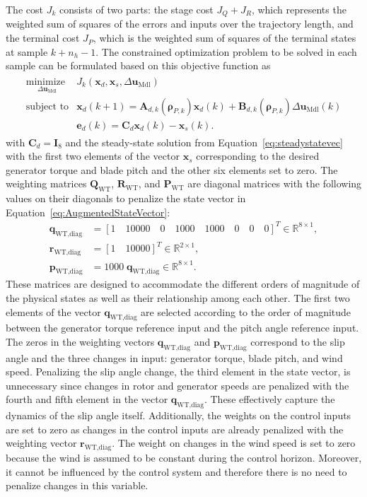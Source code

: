 The cost \( J_k \) consists of two parts: the stage cost $J_Q + J_R$, which represents the weighted sum of squares of the errors and inputs over the trajectory length, and the terminal cost $J_P$, which is the weighted sum of squares of the terminal states at sample $k+n_h-1$.
The constrained optimization problem to be solved in each sample can be formulated based on this objective function as
\begin{align} \label{eq:ObjFunWT}
    \begin{array}{ll}
        \underset{\Delta \bm{u}_{\text{Mdl}}}{\text{minimize }} & J_k(\bm{x}_d, \bm{x}_{s}, \Delta \bm{u}_{\text{Mdl}}) \\[10pt]
        \text{subject to} & \bm{x}_d(k+1) = \bm{A}_{d,k}(\bm{\rho}_{P,k}) \bm{x}_d(k) + \bm{B}_{d,k}(\bm{\rho}_{P,k}) \Delta \bm{u}_{\text{Mdl}}(k) \\[10pt]
        & \bm{e}_d(k) = \bm{C}_d \bm{x}_d(k) -\bm{x}_s(k).
    \end{array}
\end{align}
with $\bm{C}_d = \bm{I}_{8}$ and the steady-state solution from Equation~\eqref{eq:steadystatevec} with the first two elements of the vector $\bm{x}_s$ corresponding to the desired generator torque and blade pitch and the other six elements set to zero.
The weighting matrices \( \bm{Q}_{\text{WT}} \), \( \bm{R}_{\text{WT}} \), and \( \bm{P}_{\text{WT}} \) are diagonal matrices with the following values on their diagonals to penalize the state vector in Equation~\eqref{eq:AugmentedStateVector}:
\begin{align}
    \bm{q}_{\text{WT,diag}} &= [1 \quad 10000 \quad 0 \quad 1000 \quad 1000 \quad 0 \quad 0 \quad 0]^T \in \mathbb{R}^{8 \times 1}, \\
    \bm{r}_{\text{WT,diag}} &= [1 \quad 10000]^T \in \mathbb{R}^{2 \times 1}, \\
    \bm{p}_{\text{WT,diag}} &= 1000 \; \bm{q}_{\text{WT,diag}} \in \mathbb{R}^{8 \times 1}.
\end{align}
These matrices are designed to accommodate the different orders of magnitude of the physical states as well as their relationship among each other. The first two elements of the vector $\bm{q}_{\text{WT,diag}}$ are selected according to the order of magnitude between the generator torque reference input and the pitch angle reference input. The zeros in the weighting vectors $\bm{q}_{\text{WT,diag}}$ and $\bm{p}_{\text{WT,diag}}$ correspond to the slip angle and the three changes in input: generator torque, blade pitch, and wind speed. Penalizing the slip angle change, the third element in the state vector, is unnecessary since changes in rotor and generator speeds are penalized with the fourth and fifth element in the vector $\bm{q}_{\text{WT,diag}}$. These effectively capture the dynamics of the slip angle itself. Additionally, the weights on the control inputs are set to zero as changes in the control inputs are already penalized with the weighting vector $\bm{r}_{\text{WT,diag}}$. The weight on changes in the wind speed is set to zero because the wind is assumed to be constant during the control horizon. Moreover, it cannot be influenced by the control system and therefore there is no need to penalize changes in this variable. 

